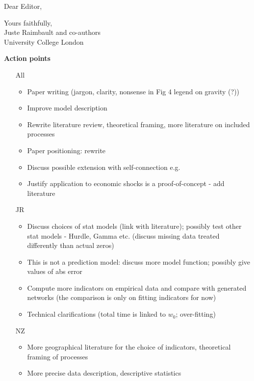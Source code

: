 \documentclass[10pt,a4paper,sans]{moderncv}        %
\begin{document}
\date{\today}
\opening{Dear Editor,}
\closing{Yours faithfully,\\
Juste Raimbault and co-authors\\
University College London
}




\justify


\textbf{Action points}

\begin{itemize}
    \item[All]
    \begin{itemize}
        \item Paper writing (jargon, clarity, nonsense in Fig 4 legend on gravity (?))
        \item Improve model description
        \item Rewrite literature review, theoretical framing, more literature on included processes
        \item Paper positioning: rewrite
        \item Discuss possible extension with self-connection e.g.
        \item Justify application to economic shocks is a proof-of-concept - add literature
    \end{itemize}
    \item[JR]
    \begin{itemize}
        \item Discuss choices of stat models (link with literature); possibly test other stat models - Hurdle, Gamma etc. (discuss missing data treated differently than actual zeros)
        \item This is not a prediction model: discuss more model function; possibly give values of abs error
        \item Compute more indicators on empirical data and compare with generated networks (the comparison is only on fitting indicators for now)
        \item Technical clarifications (total time is linked to $w_0$; over-fitting)
    \end{itemize}
    \item[NZ]
    \begin{itemize}
        \item More geographical literature for the choice of indicators, theoretical framing of processes
        \item More precise data description, descriptive statistics
    \end{itemize}
\end{itemize}
\end{document}
